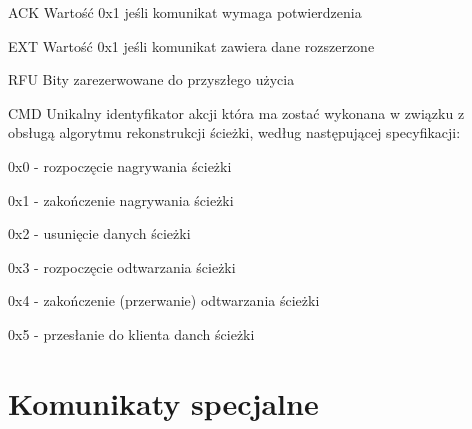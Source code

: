\begin{basedescript}{\desclabelstyle{\pushlabel}\desclabelwidth{25mm}}
\setlength{\parsep}{0pt}
\setlength{\itemsep}{0mm}
\setlength{\parskip}{0pt}
\item[ACK]
	Wartość 0x1 jeśli komunikat wymaga potwierdzenia
\item[EXT] 
	Wartość 0x1 jeśli komunikat zawiera dane rozszerzone
\item[RFU] 
	Bity zarezerwowane do przyszłego użycia
\item[CMD] 
	Unikalny identyfikator akcji która ma zostać wykonana w związku z obsługą
	algorytmu rekonstrukcji ścieżki, według następującej specyfikacji:
	\begin{desc}
	\item[0x0] - rozpoczęcie nagrywania ścieżki
	\item[0x1] - zakończenie nagrywania ścieżki
	\item[0x2] - usunięcie danych ścieżki
	\item[0x3] - rozpoczęcie odtwarzania ścieżki
	\item[0x4] - zakończenie (przerwanie) odtwarzania ścieżki
	\item[0x5] - przesłanie do klienta danch ścieżki
	\end{desc}
\end{basedescript}

\section{Komunikaty specjalne}